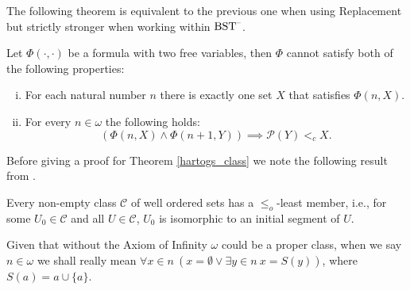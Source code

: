 The following theorem is equivalent to the previous one when using Replacement but strictly stronger when working within $\Bst$.

\begin{theorem}[$\Bst$]
	\label{hartogs_class}
	Let $\Phi(\cdot,\cdot)$ be a formula with two free variables, then $\Phi$ cannot satisfy both of the following properties:
	\begin{enumerate}[(i)]
		\item \label{nat_define} For each natural number $n$ there is exactly one set $X$ that satisfies $\Phi(n,X)$.
		\item \label{dec_seq} For every $n\in\omega$ the following holds: 
		\[
			(\Phi(n,X) \land \Phi(n+1,Y)) \implies \mathcal{P}(Y) <_c X.
		\] 
	\end{enumerate}
\end{theorem}

Before giving a proof for Theorem \ref{hartogs_class} we note the following result from \cite[Corollary 7.33]{Moscho}.

\begin{prop}\label{class_wo}
	Every non-empty class $\mathcal{C}$ of well ordered sets has a $\leq_o$-least member, i.e., for some $U_0 \in \mathcal{C}$ and all $U\in\mathcal{C}$, $U_0$ is isomorphic to an initial segment of $U$.
\end{prop}

Given that without the Axiom of Infinity $\omega$ could be a proper class, when we say $n\in\omega$ we shall really mean $\forall x\in n \ (x = \emptyset \lor \exists y \in n \ x = S(y))$, where $S(a) = a \cup \{a\}$.

